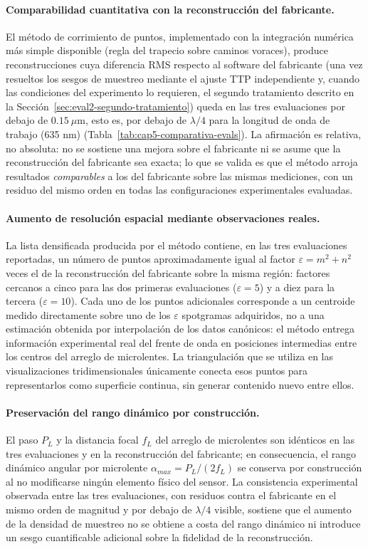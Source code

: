 \documentclass[letterpaper,12pt,oneside]{book}
\begin{document}
\paragraph{Comparabilidad cuantitativa con la reconstrucción del fabricante.} El método de
corrimiento de puntos, implementado con la integración numérica más simple disponible
(regla del trapecio sobre caminos voraces), produce reconstrucciones cuya diferencia RMS
respecto al software del fabricante (una vez resueltos los sesgos de muestreo mediante el
ajuste TTP independiente y, cuando las condiciones del experimento lo requieren, el
segundo tratamiento descrito en la Sección~\ref{sec:eval2-segundo-tratamiento}) queda en
las tres evaluaciones por debajo de $0.15~\mu$m, esto es, por debajo de $\lambda/4$ para
la longitud de onda de trabajo (635 nm) (Tabla~\ref{tab:cap5-comparativa-evals}). La
afirmación es relativa, no absoluta: no se sostiene una mejora sobre el fabricante ni se
asume que la reconstrucción del fabricante sea exacta; lo que se valida es que el método
arroja resultados \emph{comparables} a los del fabricante sobre las mismas mediciones, con
un residuo del mismo orden en todas las configuraciones experimentales evaluadas.

\paragraph{Aumento de resolución espacial mediante observaciones reales.} La lista
densificada producida por el método contiene, en las tres evaluaciones reportadas, un
número de puntos aproximadamente igual al factor $\varepsilon = m^2 + n^2$ veces el de la
reconstrucción del fabricante sobre la misma región: factores cercanos a cinco para las
dos primeras evaluaciones ($\varepsilon=5$) y a diez para la tercera ($\varepsilon=10$).
Cada uno de los puntos adicionales corresponde a un centroide medido directamente sobre
uno de los $\varepsilon$ spotgramas adquiridos, no a una estimación obtenida por
interpolación de los datos canónicos: el método entrega información experimental real del
frente de onda en posiciones intermedias entre los centros del arreglo de microlentes. La
triangulación que se utiliza en las visualizaciones tridimensionales únicamente conecta
esos puntos para representarlos como superficie continua, sin generar contenido nuevo
entre ellos.

\paragraph{Preservación del rango dinámico por construcción.} El paso $P_L$ y la distancia
focal $f_L$ del arreglo de microlentes son idénticos en las tres evaluaciones y en la
reconstrucción del fabricante; en consecuencia, el rango dinámico angular por microlente
$\alpha_{max}=P_L/(2f_L)$ se conserva por construcción al no modificarse ningún elemento
físico del sensor. La consistencia experimental observada entre las tres evaluaciones, con
residuos contra el fabricante en el mismo orden de magnitud y por debajo de $\lambda/4$
visible, sostiene que el aumento de la densidad de muestreo no se obtiene a costa del
rango dinámico ni introduce un sesgo cuantificable adicional sobre la fidelidad de la
reconstrucción.
\end{document}
